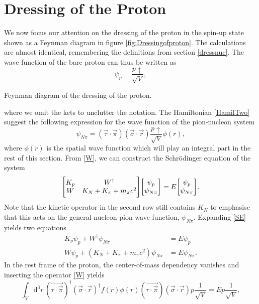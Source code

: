 \section{Dressing of the Proton} \label{sec:DressingofProton}
We now focus our attention on the dressing of the proton in the spin-up state shown as a Feynman diagram in figure \ref{fig:Dressingofproton}. The calculations are almost identical, remembering the definitions from section \ref{dressnuc}. The wave function of the bare proton can thus be written as
\begin{equation} \label{bareproton}
	\psi_p = \frac{p\uparrow}{\sqrt{V}},
\end{equation}
\begin{marginfigure}
	\centering
	
	\caption{Feynman diagram of the dressing of the proton.}
	\label{fig:Dressingofproton}
\end{marginfigure} 
\noindent where we omit the kets to unclutter the notation. The Hamiltonian \eqref{HamilTwo} suggest the following expression for the wave function of the pion-nucleon system
\begin{equation} \label{pionnuc}
	\psi_{N\pi} = (\vec{\tau}\cdot\vec{\pi})(\vec{\sigma}\cdot\vec{r})\frac{p \uparrow}{\sqrt{V}}\phi(r),
\end{equation}
where $\phi(r)$ is the spatial wave function which will play an integral part in the rest of this section.
From \eqref{W}, we can construct the Schrödinger equation of the system
\begin{equation}\label{SE}
	\mqty[K_{p} & W^\dagger \\ W & K_{N}+K_{\pi}+m_\pi c^2]\mqty[\psi_p \\ \psi_{N\pi}] = E \mqty[\psi_p \\ \psi_{N\pi}].
\end{equation}
Note that the kinetic operator in the second row still contains $K_N$ to emphasise that this acts on the general nucleon-pion wave function, $\psi_{N\pi}$. Expanding \eqref{SE} yields two equations
\begin{align}
	K_{p}\psi_p + W^\dagger \psi_{N\pi} & = E\psi_p \label{SE1} \\
	W\psi_p + (K_{N}+K_{\pi}+m_\pi c^2)\psi_{N\pi} & = E\psi_{N\pi} \label{SE2}.
\end{align}
In the rest frame of the proton, the center-of-mass dependency vanishes and inserting the operator \eqref{W} yields
\begin{equation}
	\int_V \text{d}^3r \, (\vec{\tau\cdot\vec{\pi}})^\dagger(\vec{\sigma}\cdot\vec{r})^\dagger f(r)\phi(r)(\vec{\tau\cdot\vec{\pi}})(\vec{\sigma}\cdot\vec{r})p\frac{1}{\sqrt{V}} = E p\frac{1}{\sqrt{V}},
\end{equation}
